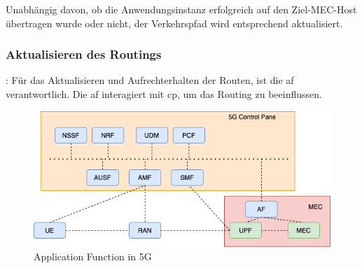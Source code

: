 \documentclass[runningheads]{llncs}
\numberwithin{figure}{section}
\begin{document}
Unabhängig davon, ob die Anwendungsinstanz erfolgreich auf den Ziel-MEC-Host übertragen wurde oder nicht, 
der Verkehrspfad wird entsprechend aktualisiert. \cite{etsiMultiaccessEdgeComputinga}
\subsubsection{Aktualisieren des Routings}:
Für das Aktualisieren und Aufrechterhalten der Routen, ist die \acrlong{af} verantwortlich.
Die \acrfull{af} interagiert mit \acrshort{cp},  um das Routing zu beeinflussen. 

\begin{figure}
  \includegraphics[width=\linewidth]{images/AF_5G.png}
  \caption{Application Function in 5G}
  \label{fig:AF_GG}
\end{figure}
\end{document}
